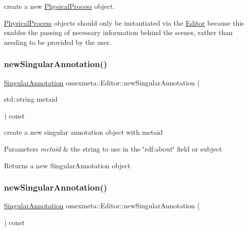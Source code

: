 create a new \hyperlink{classomexmeta_1_1PhysicalProcess}{Physical\+Process} object. 

\hyperlink{classomexmeta_1_1PhysicalProcess}{Physical\+Process} objects should only be instantiated via the \hyperlink{classomexmeta_1_1Editor}{Editor} because this enables the passing of necessary information behind the scenes, rather than needing to be provided by the user. \mbox{\label{classomexmeta_1_1Editor_a50674b2591d2fed572954ac8490ee21c}} 
\subsubsection{\texorpdfstring{new\+Singular\+Annotation()}{newSingularAnnotation()}\hspace{0.1cm}{\footnotesize\ttfamily [1/2]}}
{\footnotesize\ttfamily \hyperlink{classomexmeta_1_1Triple}{Singular\+Annotation} omexmeta\+::\+Editor\+::new\+Singular\+Annotation (\begin{DoxyParamCaption}\item[{std\+::string}]{metaid }\end{DoxyParamCaption}) const}



create a new singular annotation object with metaid 


\begin{DoxyParams}{Parameters}
{\em metaid} & the string to use in the \char`\"{}rdf\+:about\char`\"{} field or subject \\
\hline
\end{DoxyParams}
\begin{DoxyReturn}{Returns}
a new Singular\+Annotation object 
\end{DoxyReturn}
\mbox{\label{classomexmeta_1_1Editor_a6142da2b89068e9638410c3c903e3b64}} 
\subsubsection{\texorpdfstring{new\+Singular\+Annotation()}{newSingularAnnotation()}\hspace{0.1cm}{\footnotesize\ttfamily [2/2]}}
{\footnotesize\ttfamily \hyperlink{classomexmeta_1_1Triple}{Singular\+Annotation} omexmeta\+::\+Editor\+::new\+Singular\+Annotation (\begin{DoxyParamCaption}{ }\end{DoxyParamCaption}) const}



